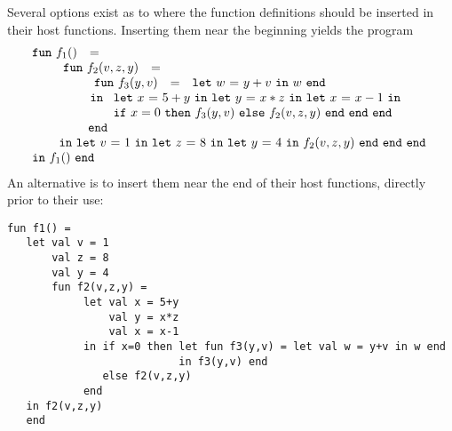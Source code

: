 Several options exist as to where the function definitions should be
inserted in their host functions.  Inserting them near the beginning yields the
program $$
\begin{array}{l}
  \begin{array}{lcl}\mathtt{fun}\ f_1() & = & \end{array}\\
  \qquad
   \begin{array}[t]{l} 
     \begin{array}{lcl}\mathtt{fun}\ f_2(v,z,y) & = & \end{array}\\
     \qquad \begin{array}{l}  
             \begin{array}{lcl}\mathtt{fun}\ f_3(y,v) & = & \letin w {y+v} w\end{array}\\
             \, \mathtt{in}\
              \begin{array}[t]{l}
                \letinD x {5+y} {
                  \letinD y {x*z} {
                   \letinD x {x-1} {}}}\\ 
                  \ite {x=0} {\call {f_3} {y,v}}
                     {\call {f_2} {v,z,y}}\ \mathtt{end}\ \mathtt{end}\ \mathtt{end}
              \end{array}\\
             \mathtt{end}
           \end{array}\\
     \, \mathtt{in}\ \letin v 1 {
              \letin z 8 {
                 \letin y 4 {\call {f_2} {v,z,y}}
              }
            }
   \end{array}\\
\begin{array}{lcl}
  \mathtt{in}\ f_1()\ \mathtt{end}
\end{array} 
\end{array}
$$ 
An alternative is to insert them near the end of their host
functions, directly prior to their use: 
\begin{verbatim}
fun f1() = 
   let val v = 1 
       val z = 8 
       val y = 4
       fun f2(v,z,y) = 
            let val x = 5+y
                val y = x*z
                val x = x-1
            in if x=0 then let fun f3(y,v) = let val w = y+v in w end
                           in f3(y,v) end
               else f2(v,z,y)
            end
   in f2(v,z,y) 
   end
\end{verbatim}
